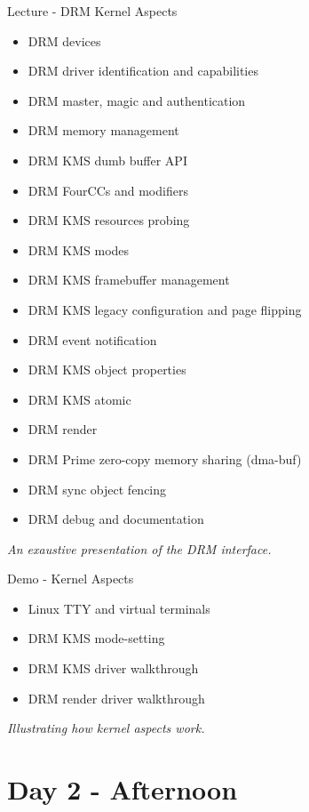 \documentclass[a4paper,12pt,obeyspaces,spaces,hyphens]{article}
\begin{document}
\feagendatwocolumn
{Lecture - DRM Kernel Aspects}
{
  \begin{itemize}
  \item DRM devices
  \item DRM driver identification and capabilities
  \item DRM master, magic and authentication
  \item DRM memory management
  \item DRM KMS dumb buffer API
  \item DRM FourCCs and modifiers
  \item DRM KMS resources probing
  \item DRM KMS modes
  \item DRM KMS framebuffer management
  \item DRM KMS legacy configuration and page flipping
  \item DRM event notification
  \item DRM KMS object properties
  \item DRM KMS atomic
  \item DRM render
  \item DRM Prime zero-copy memory sharing (dma-buf)
  \item DRM sync object fencing
  \item DRM debug and documentation
  \end{itemize}
  \vspace{0.5em}
  {\em An exaustive presentation of the DRM interface.}
}
{Demo - Kernel Aspects}
{
  \begin{itemize}
  \item Linux TTY and virtual terminals
  \item DRM KMS mode-setting
  \item DRM KMS driver walkthrough
  \item DRM render driver walkthrough
  \end{itemize}
  \vspace{0.5em}
  {\em Illustrating how kernel aspects work.}
}

\section{Day 2 - Afternoon}
\end{document}

